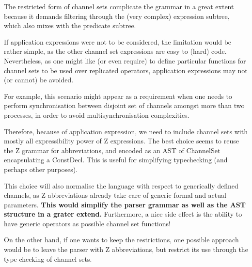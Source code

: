 \documentclass{article}
\newcommand{\code}[1]{\textsf{#1}}
\begin{document}
%
\begin{issue}
  The restricted form of channel sets complicate the grammar in a great
  extent because it demands filtering through the (very complex) expression
  subtree, which also mixes with the predicate subtree.

  If application expressions were not to be considered, the limitation would be
  rather simple, as the other channel set expressions are easy to (hard) code. Nevertheless,
  as one might like (or even require) to define particular functions for
  channel sets to be used over replicated operators, application expressions may not (or cannot) be
  avoided.

  For example, this scenario might appear as a requirement when one needs to perform
  synchronisation between disjoint set of channels amongst more than two processes,
  in order to avoid multisynchronisation complexities.

  Therefore, because of application expression, we need to include channel sets with mostly
  all expressibility power of Z expressions. The best choice seems to reuse the
  Z grammar for abbreviations, and encoded as an AST of \code{ChannelSet}
  encapsulating a \code{ConstDecl}. This is useful for simplifying typechecking
  (and perhaps other purposes).

  This choice will also normalise the language with respect to generically
  defined channels, as Z abbreviations already take care of generic formal and
  actual parameters. \textbf{This would simplify the parser grammar as well as the AST structure in a grater
  extend.} Furthermore, a nice side effect is the ability to have generic
  operators as possible channel set functions!

  On the other hand, if one wants to keep the restrictions, one possible
  approach would be to leave the parser with Z abbreviations, but restrict
  its use through the type checking of channel sets.
\end{issue}
\end{document}
